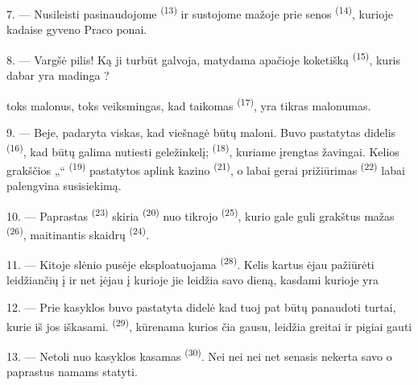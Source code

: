 7. --- Nusileisti pasinaudojome  \textsuperscript{(13)} ir
sustojome mažoje  prie senos 
 \textsuperscript{(14)}, kurioje kadaise gyveno Praco ponai.

8. --- Vargšė pilis! Ką ji turbūt galvoja, matydama apačioje koketišką
 \textsuperscript{(15)}, kuris dabar yra madinga ?

 toks malonus,  toks veiksmingas, kad
 taikomas  \textsuperscript{(17)}, yra tikras
malonumas.

\VUsaut{3.0mm}
\VUsaut{3.0mm}

9. --- Beje, padaryta viskas, kad viešnagė būtų maloni. Buvo pastatytas didelis
 \textsuperscript{(16)}, kad būtų galima nutiesti geležinkelį;
  \textsuperscript{(18)}, kuriame
 įrengtas žavingai. Kelios grakščios „“
\textsuperscript{(19)} pastatytos aplink
kazino \textsuperscript{(21)}, o labai gerai prižiūrimas 
\textsuperscript{(22)} labai palengvina susisiekimą.

10. --- Paprastas  \textsuperscript{(23)} skiria 
\textsuperscript{(20)} nuo tikrojo  \textsuperscript{(25)}, kurio gale
guli grakštus mažas  \textsuperscript{(26)}, maitinantis skaidrų
 \textsuperscript{(24)}.

11. --- Kitoje slėnio pusėje eksploatuojama 
\textsuperscript{(28)}. Kelis kartus ėjau pažiūrėti  leidžiančių
į  ir net įėjau į  kurioje jie leidžia savo dieną,
kasdami  kurioje yra 

12. --- Prie kasyklos buvo pastatyta didelė  kad tuoj pat būtų
panaudoti turtai, kurie iš jos iškasami.  \textsuperscript{(29)},
kūrenama  kurios čia gausu, leidžia greitai ir pigiai gauti

13. --- Netoli nuo kasyklos kasamas  \textsuperscript{(30)}.
Nei  nei  nei net  senasis
 nekerta savo  o paprastus  namams statyti.

